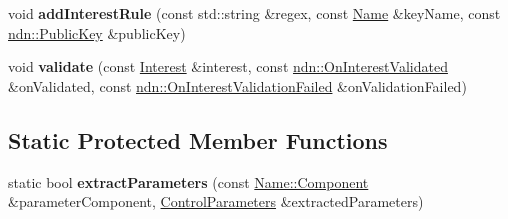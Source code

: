 \begin{DoxyCompactItemize}
\item 
void {\bfseries add\+Interest\+Rule} (const std\+::string \&regex, const \hyperlink{classndn_1_1Name}{Name} \&key\+Name, const \hyperlink{classndn_1_1PublicKey}{ndn\+::\+Public\+Key} \&public\+Key)\hypertarget{classnfd_1_1ManagerBase_ad3174663ebae30e38180bae0eb7150af}{}\label{classnfd_1_1ManagerBase_ad3174663ebae30e38180bae0eb7150af}

\item 
void {\bfseries validate} (const \hyperlink{classndn_1_1Interest}{Interest} \&interest, const \hyperlink{namespacendn_a90fe4b4d97a7870d87f2fce8fdc88f95}{ndn\+::\+On\+Interest\+Validated} \&on\+Validated, const \hyperlink{namespacendn_a6cb4f04de7c1e8da06d8f5865b3d2877}{ndn\+::\+On\+Interest\+Validation\+Failed} \&on\+Validation\+Failed)\hypertarget{classnfd_1_1ManagerBase_af70c3c6f907c20ee72b78e5681569921}{}\label{classnfd_1_1ManagerBase_af70c3c6f907c20ee72b78e5681569921}

\end{DoxyCompactItemize}
\subsection*{Static Protected Member Functions}
\begin{DoxyCompactItemize}
\item 
static bool {\bfseries extract\+Parameters} (const \hyperlink{classndn_1_1name_1_1Component}{Name\+::\+Component} \&parameter\+Component, \hyperlink{classndn_1_1nfd_1_1ControlParameters}{Control\+Parameters} \&extracted\+Parameters)\hypertarget{classnfd_1_1ManagerBase_ab32ed35597421b247f93df521bb9661d}{}\label{classnfd_1_1ManagerBase_ab32ed35597421b247f93df521bb9661d}

\end{DoxyCompactItemize}
